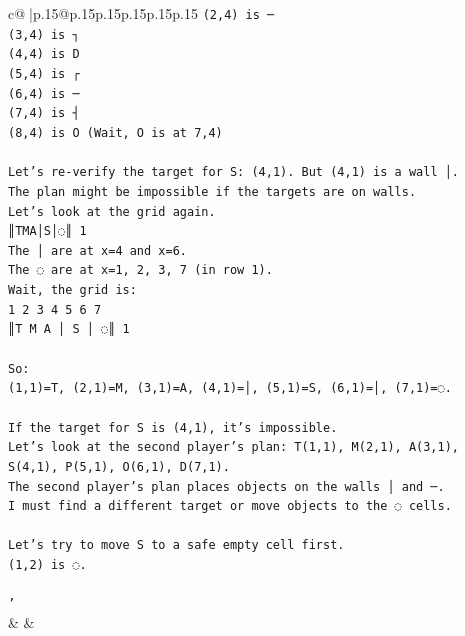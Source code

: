 \documentclass{article}
\begin{document}
{\begin{supertabular}{c@{$\;$}|p{.15\linewidth}@{}p{.15\linewidth}p{.15\linewidth}p{.15\linewidth}p{.15\linewidth}p{.15\linewidth}}
{{{\texttt{(2,4) is ─} \\
\texttt{(3,4) is ┐} \\
\texttt{(4,4) is D} \\
\texttt{(5,4) is ┌} \\
\texttt{(6,4) is ─} \\
\texttt{(7,4) is ┤} \\
\texttt{(8,4) is O (Wait, O is at 7,4)} \\
\\ 
\texttt{Let's re{-}verify the target for S: (4,1). But (4,1) is a wall │.} \\
\texttt{The plan might be impossible if the targets are on walls.} \\
\texttt{Let's look at the grid again.} \\
\texttt{║TMA│S│◌║ 1} \\
\texttt{The │ are at x=4 and x=6.} \\
\texttt{The ◌ are at x=1, 2, 3, 7 (in row 1).} \\
\texttt{Wait, the grid is:} \\
\texttt{1 2 3 4 5 6 7} \\
\texttt{║T M A │ S │ ◌║ 1} \\
\\ 
\texttt{So:} \\
\texttt{(1,1)=T, (2,1)=M, (3,1)=A, (4,1)=│, (5,1)=S, (6,1)=│, (7,1)=◌.} \\
\\ 
\texttt{If the target for S is (4,1), it's impossible.} \\
\texttt{Let's look at the second player's plan: T(1,1), M(2,1), A(3,1), S(4,1), P(5,1), O(6,1), D(7,1).} \\
\texttt{The second player's plan places objects on the walls │ and ─.} \\
\texttt{I must find a different target or move objects to the ◌ cells.} \\
\\ 
\texttt{Let's try to move S to a safe empty cell first.} \\
\texttt{(1,2) is ◌.} \\
\\ 
\texttt{'} \\
            }
        }
    }
    & & \\ \\


\end{supertabular}}
\end{document}

